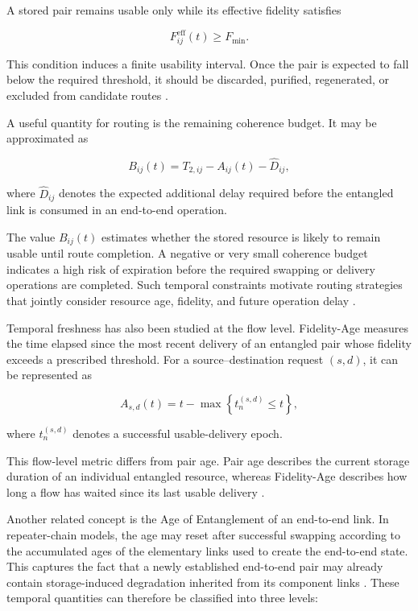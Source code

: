 A stored pair remains usable only while its effective fidelity satisfies

\begin{equation}
    F_{ij}^{\mathrm{eff}}(t)
    \geq
    F_{\min}.
\end{equation}

This condition induces a finite usability interval. Once the pair is expected to fall below the required threshold, it should be discarded, purified, regenerated, or excluded from candidate routes \cite{pant2019routing,halder2024optimal}.

A useful quantity for routing is the remaining coherence budget. It may be approximated as

\begin{equation}
    B_{ij}(t)
    =
    T_{2,ij}
    -
    A_{ij}(t)
    -
    \widehat{D}_{ij},
\end{equation}

where $\widehat{D}_{ij}$ denotes the expected additional delay required before the entangled link is consumed in an end-to-end operation.

The value $B_{ij}(t)$ estimates whether the stored resource is likely to remain usable until route completion. A negative or very small coherence budget indicates a high risk of expiration before the required swapping or delivery operations are completed. Such temporal constraints motivate routing strategies that jointly consider resource age, fidelity, and future operation delay \cite{ercetin2026fidelityage,ceran2026age,chen2023adaptive}.

Temporal freshness has also been studied at the flow level. Fidelity-Age measures the time elapsed since the most recent delivery of an entangled pair whose fidelity exceeds a prescribed threshold. For a source--destination request $(s,d)$, it can be represented as

\begin{equation}
    A_{s,d}(t)
    =
    t
    -
    \max
    \left\{
    t_n^{(s,d)}
    \leq t
    \right\},
\end{equation}

where $t_n^{(s,d)}$ denotes a successful usable-delivery epoch.

This flow-level metric differs from pair age. Pair age describes the current storage duration of an individual entangled resource, whereas Fidelity-Age describes how long a flow has waited since its last usable delivery \cite{ercetin2026fidelityage}.

Another related concept is the Age of Entanglement of an end-to-end link. In repeater-chain models, the age may reset after successful swapping according to the accumulated ages of the elementary links used to create the end-to-end state. This captures the fact that a newly established end-to-end pair may already contain storage-induced degradation inherited from its component links \cite{ceran2026age}.
These temporal quantities can therefore be classified into three levels:

